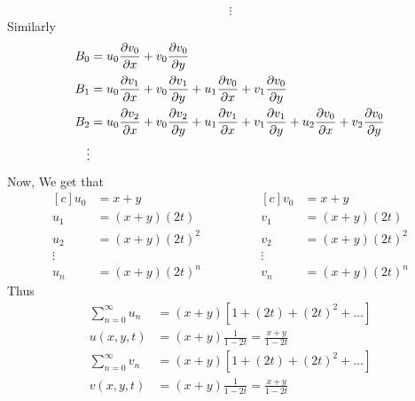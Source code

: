 \begin{example}
\begin{align*}
        \\
        \vdots
    \end{align*}
    Similarly
    \begin{align*}
        B_0 & = u_0 \pdv{v_0}{x}+v_0 \pdv{v_0}{y}
        \\
        B_1 & = u_0 \pdv{v_1}{x} + v_0 \pdv{v_1}{y} + u_1 \pdv{v_0}{x} + v_1 \pdv{v_0}{y}
        \\
        B_2 & = u_0 \pdv{v_2}{x} + v_0 \pdv{v_2}{y} + u_1 \pdv{v_1}{x} + v_1 \pdv{v_1}{y} + u_2 \pdv{v_0}{x} + v_2 \pdv{v_0}{y}
        \\
        \vdots
    \end{align*}
    Now, We get that
    \begin{equation*}
        \begin{aligned}[c]
            u_0 & =  x+y
            \\
            u_1 & = (x+y)(2t)
            \\
            u_2 & = (x+y)(2t)^2
            \\
            \vdots
            \\
            u_n & = (x+y)(2t)^n
        \end{aligned}
        \qquad\qquad
        \begin{aligned}[c]
            v_0 & =  x+y
            \\
            v_1 & = (x+y)(2t)
            \\
            v_2 & = (x+y)(2t)^2
            \\
            \vdots
            \\
            v_n & = (x+y)(2t)^n
        \end{aligned}
    \end{equation*}
    Thus
    \begin{align*}
        \sum_{n=0}^{\infty} u_n & =(x+y)\left[ 1+(2t) + (2t)^2 + \dots \right] \\
        u(x,y,t)                & =(x+y)\frac{1}{1-2t} = \frac{x+y}{1-2t}      \\
        \sum_{n=0}^{\infty} v_n & =(x+y)\left[ 1+(2t) + (2t)^2 + \dots \right] \\
        v(x,y,t)                & =(x+y)\frac{1}{1-2t} = \frac{x+y}{1-2t}      \\
    \end{align*}
\end{example}
\newpage
\setcounter{equation}{0}
